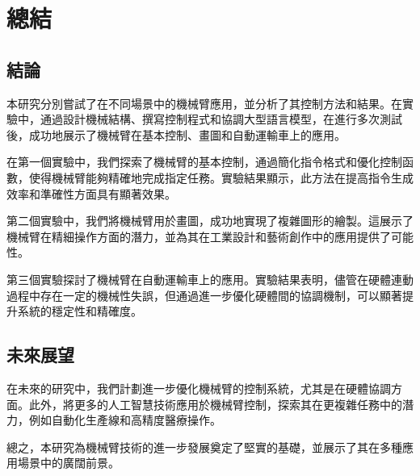 \documentclass[class=NCU_thesis, crop=false]{standalone}
\begin{document}
\chapter{總結}

\section{結論}

本研究分別嘗試了在不同場景中的機械臂應用，並分析了其控制方法和結果。在實驗中，通過設計機械結構、撰寫控制程式和協調大型語言模型，在進行多次測試後，成功地展示了機械臂在基本控制、畫圖和自動運輸車上的應用。

在第一個實驗中，我們探索了機械臂的基本控制，通過簡化指令格式和優化控制函數，使得機械臂能夠精確地完成指定任務。實驗結果顯示，此方法在提高指令生成效率和準確性方面具有顯著效果。

第二個實驗中，我們將機械臂用於畫圖，成功地實現了複雜圖形的繪製。這展示了機械臂在精細操作方面的潛力，並為其在工業設計和藝術創作中的應用提供了可能性。

第三個實驗探討了機械臂在自動運輸車上的應用。實驗結果表明，儘管在硬體連動過程中存在一定的機械性失誤，但通過進一步優化硬體間的協調機制，可以顯著提升系統的穩定性和精確度。

\section{未來展望}
在未來的研究中，我們計劃進一步優化機械臂的控制系統，尤其是在硬體協調方面。此外，將更多的人工智慧技術應用於機械臂控制，探索其在更複雜任務中的潛力，例如自動化生產線和高精度醫療操作。

總之，本研究為機械臂技術的進一步發展奠定了堅實的基礎，並展示了其在多種應用場景中的廣闊前景。
\end{document}
